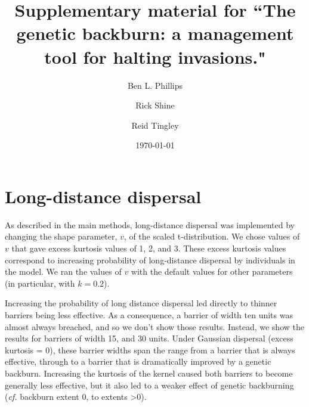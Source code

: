 \documentclass{article}
\begin{document}
\title{Supplementary material for ``The genetic backburn: a management tool for halting invasions."}

\author{Ben L. Phillips}

  
\author{Rick Shine}
  
\author{Reid Tingley}
  


\date{\today}



\maketitle 



\section{Long-distance dispersal}

As described in the main methods, long-distance dispersal was implemented by changing the shape parameter, $v$, of the scaled t-distribution.  We chose values of $v$ that gave excess kurtosis values of 1, 2, and 3.  These excess kurtosis values correspond to increasing probability of long-distance dispersal by individuals in the model.  We ran the values of $v$ with the default values for other parameters (in particular, with $k=0.2$).

Increasing the probability of long distance dispersal led directly to thinner barriers being less effective.  As a consequence, a barrier of width ten units was almost always breached, and so we don't show those results.  Instead, we show the results for barriers of width 15, and 30 units.  Under Gaussian dispersal (excess kurtosis = 0), these barrier widths span the range from a barrier that is always effective, through to a barrier that is dramatically improved by a genetic backburn.  Increasing the kurtosis of the kernel caused both barriers to become generally less effective, but it also led to a weaker effect of genetic backburning (\emph{cf.} backburn extent 0, to extents \textgreater 0).
\end{document}
